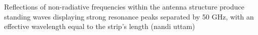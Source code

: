 Reflections of non-radiative frequencies within the antenna structure produce standing waves displaying strong resonance peaks separated by 50 GHz, with an effective wavelength equal to the strip’s length (nandi uttam)